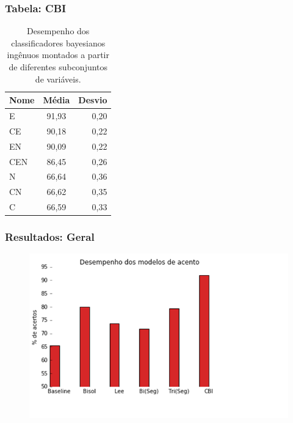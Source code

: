 \documentclass[xcolor=table]{beamer}
\begin{document}
	\begin{frame}
		\frametitle{Tabela: CBI}
		\begin{table}[]
			\centering
			\label{TAB44}
			\caption{Desempenho dos classificadores bayesianos ingênuos montados a partir de diferentes subconjuntos de variáveis.}
			\begin{tabular}{@{}lcr@{}}
				
				\textbf{Nome}  & \textbf{Média} & \textbf{Desvio} \\ \midrule
				E              & 91,93          & 0,20            \\
				CE             & 90,18          & 0,22            \\
				EN             & 90,09          & 0,22            \\
				CEN            & 86,45          & 0,26            \\
				N              & 66,64          & 0,36            \\
				CN             & 66,62          & 0,35            \\
				C              & 66,59          & 0,33            \\
			\end{tabular}
		\end{table}
	\end{frame}
	\begin{frame}
		\frametitle{Resultados: Geral}
		\begin{figure}
\centering
\includegraphics[width=0.9\linewidth]{graf-cbigeral}
\label{fig:graf-cbigeral}
\end{figure}

	\end{frame}
\end{document}
